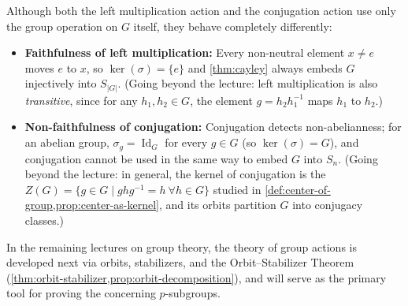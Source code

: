 \begin{insight}
Although both the left multiplication action and the conjugation action use only the group operation on $G$ itself, they behave completely differently:
\begin{itemize}
    \item \textbf{Faithfulness of left multiplication:} Every non-neutral element $x \neq e$ moves $e$ to $x$, so $\ker(\sigma) = \{e\}$ and \cref{thm:cayley} always embeds $G$ injectively into $S_{|G|}$. (Going beyond the lecture: left multiplication is also \emph{transitive}, since for any $h_1, h_2 \in G$, the element $g = h_2 h_1^{-1}$ maps $h_1$ to $h_2$.)
    \item \textbf{Non-faithfulness of conjugation:} Conjugation detects non-abelianness; for an abelian group, $\sigma_g = \operatorname{Id}_G$ for every $g \in G$ (so $\ker(\sigma) = G$), and conjugation cannot be used in the same way to embed $G$ into $S_n$. (Going beyond the lecture: in general, the kernel of conjugation is the  $Z(G) = \{ g \in G \mid ghg^{-1} = h \ \forall h \in G \}$ studied in \cref{def:center-of-group,prop:center-as-kernel}, and its orbits partition $G$ into conjugacy classes.)
\end{itemize}
In the remaining lectures on group theory, the theory of group actions is developed next via orbits, stabilizers, and the Orbit--Stabilizer Theorem (\cref{thm:orbit-stabilizer,prop:orbit-decomposition}), and will serve as the primary tool for proving the  concerning $p$-subgroups.
\end{insight}

